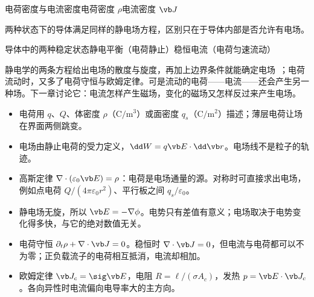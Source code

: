 \begin{compare}{电荷密度与电流密度}{电荷密度 $\rho$}{电流密度 $\vb J$}
\end{compare}

两种状态下的导体满足同样的静电场方程，区别只在于导体内部是否允许有电场。

\begin{compare}{导体中的两种稳定状态}{静电平衡（电荷静止）}{稳恒电流（电荷匀速流动）}
\end{compare}

静电学的两条方程给出电场的散度与旋度，再加上边界条件就能确定电场~\cite{griffiths}；电荷流动时，又多了电荷守恒与欧姆定律。可是流动的电荷——电流——还会产生另一种场。下一章讨论它：电流怎样产生磁场，变化的磁场又怎样反过来产生电场。

\begin{takeaways}
\begin{itemize}
\item 电荷用 $q$、$Q$、体密度 $\rho$（$\mathrm{C/m^3}$）或面密度 $q_s$（$\mathrm{C/m^2}$）描述；薄层电荷让场在界面两侧跳变。
\item 电场由静止电荷的受力定义，$\dd W=q\vb E\cdot\dd\vb r$。电场线不是粒子的轨迹。
\item 高斯定律 $\nabla\cdot(\varepsilon_0\vb E)=\rho$：电荷是电场通量的源。对称时可直接求出电场，例如点电荷 $Q/(4\pi\varepsilon_0r^2)$、平行板之间 $q_s/\varepsilon_0$。
\item 静电场无旋，所以 $\vb E=-\nabla\phi$。电势只有差值有意义；电场取决于电势变化得多快，与它的绝对数值无关。
\item 电荷守恒 $\partial_t\rho+\nabla\cdot\vb J=0$。稳恒时 $\nabla\cdot\vb J=0$，但电流与电荷都可以不为零；正负载流子的电荷相互抵消，电流却相加。
\item 欧姆定律 $\vb J_c=\sig\vb E$，电阻 $R=\ell/(\sigma A_c)$，发热 $p=\vb E\cdot\vb J_c$。各向异性时电流偏向电导率大的主方向。
\end{itemize}
\end{takeaways}

